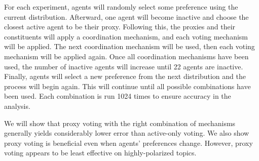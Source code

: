 For each experiment, agents will randomly select some preference using the current
distribution.
Afterward, one agent
will become inactive and choose the closest active agent to be their proxy.
Following this, the proxies and their constituents will apply a coordination
mechanism, and each voting mechanism will be applied.
The next coordination mechanism will be used, then each voting mechanism will be
applied again.
Once all coordination mechanisms have been used, the number of inactive agents will
increase until 22 agents are inactive.
Finally, agents will select a new preference from the next distribution and the
process will begin again.
This will continue until all possible combinations have been used.
%
Each combination is run 1024 times to ensure accuracy in the analysis.

We will show that proxy voting with the right combination of mechanisms generally
yields considerably lower error than active-only voting.
We also show proxy voting is beneficial even when agents' preferences change.
However, proxy voting appears to be least effective on highly-polarized topics.
